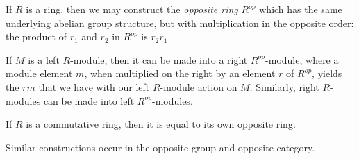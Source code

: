 \documentclass{article}
\begin{document}
If $R$ is a ring, then we may construct the {\it opposite ring} $R^{op}$ which has the same underlying abelian group structure, but with multiplication in the opposite order: the product of $r_1$ and $r_2$ in $R^{op}$ is $r_2 r_1$.
\par
If $M$ is a left $R$-module, then it can be made into a right $R^{op}$-module, where a module element $m$, when multiplied on the right by an element $r$ of $R^{op}$, yields the $rm$ that we have with our left $R$-module action on $M$.  Similarly, right $R$-modules can be made into left $R^{op}$-modules.
\par
If $R$ is a commutative ring, then it is equal to its own opposite ring.
\par
Similar constructions occur in the opposite group and opposite category.
\end{document}
